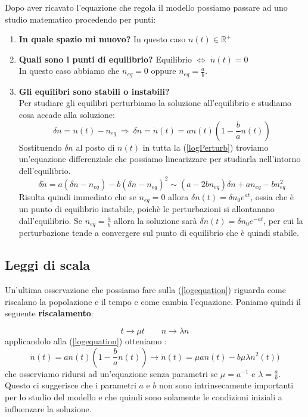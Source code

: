 Dopo aver ricavato l'equazione che regola il modello possiamo passare ad uno studio matematico procedendo per punti:

\begin{enumerate}
	\item \textbf{In quale spazio mi muovo?} In questo caso $n(t)\in\mathbb{R}^+$
	\item \textbf{Quali sono i punti di equilibrio?} Equilibrio $\Longleftrightarrow$ $\dot{n}(t)=0$ \\ In questo caso abbiamo che $n_{eq}= 0 $ oppure $ n_{eq}= \frac{a}{b}$.
	\item \textbf{Gli equilibri sono stabili o instabili?} \\ Per studiare gli equilibri perturbiamo la soluzione all'equilibrio e studiamo cosa accade alla soluzione:
	\begin{equation}
		\delta n=n(t)-n_{eq} \ \Rightarrow \ \delta \dot{n}=\dot{n}(t)=an(t)(1-\frac{b}{a}n(t))
		\label{logPerturb}
	\end{equation}
     Sostituendo $\delta n$ al posto di $n(t)$ in tutta la (\ref{logPerturb}) troviamo un'equazione differenziale che possiamo linearizzare per studiarla nell'intorno dell'equilibrio.
     \begin{equation}
     	\delta \dot{n}=a(\delta n- n_{eq})-b(\delta n- n_{eq})^2\sim (a-2bn_{eq})\delta n+an_{eq}-bn^2_{eq}
     \end{equation}
 Risulta quindi immediato che se $n_{eq}=0$ allora $\delta n(t)=\delta n_0 e^{at}$, ossia che è un punto di equilibrio instabile, poichè le perturbazioni si allontanano dall'equilibrio. Se $n_{eq}=\frac{a}{b}$ allora la soluzione sarà  $\delta n(t)=\delta n_0 e^{-at}$, per cui la perturbazione tende a convergere sul punto di equilibrio che è quindi stabile.
\end{enumerate}

\subsection{Leggi di scala}

Un'ultima osservazione che possiamo fare sulla (\ref{logequation}) riguarda come riscalano la popolazione e il tempo e come cambia l'equazione. Poniamo quindi il seguente \textbf{riscalamento}:

\begin{equation}
	t\longrightarrow\mu t \qquad n\longrightarrow\lambda n
\end{equation}
applicandolo alla (\ref{logequation}) otteniamo :
\begin{equation}
	\dot{n}(t)=an(t)(1-\frac{b}{a}n(t))\longrightarrow\dot{n}(t)=\mu an(t)-b\mu \lambda n^2(t))
\end{equation}
che osserviamo ridursi ad un'equazione senza parametri se $\mu=a^{-1}$ e $\lambda=\frac{a}{b}$. Questo ci suggerisce che i parametri $a$ e $b$ non sono intrinsecamente importanti per lo studio del modello e che quindi sono solamente le condizioni iniziali a influenzare la soluzione. 
